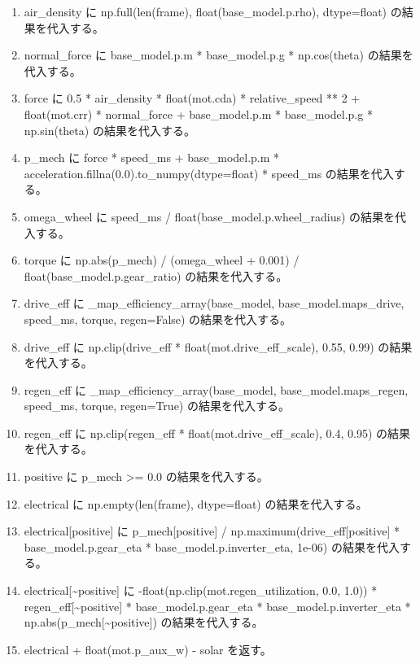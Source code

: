 \documentclass[a4paper,11pt]{article}
\begin{document}
\begin{enumerate}[leftmargin=1.8em]
\item   air\_density に np.full(len(frame), float(base\_model.p.rho), dtype=float) の結果を代入する。
\item normal\_force に base\_model.p.m * base\_model.p.g * np.cos(theta) の結果を代入する。
\item force に 0.5 * air\_density * float(mot.cda) * relative\_speed ** 2 + float(mot.crr) * normal\_force + base\_model.p.m * base\_model.p.g * np.sin(theta) の結果を代入する。
\item p\_mech に force * speed\_ms + base\_model.p.m * acceleration.fillna(0.0).to\_numpy(dtype=float) * speed\_ms の結果を代入する。
\item omega\_wheel に speed\_ms / float(base\_model.p.wheel\_radius) の結果を代入する。
\item torque に np.abs(p\_mech) / (omega\_wheel + 0.001) / float(base\_model.p.gear\_ratio) の結果を代入する。
\item drive\_eff に \_map\_efficiency\_array(base\_model, base\_model.maps\_drive, speed\_ms, torque, regen=False) の結果を代入する。
\item drive\_eff に np.clip(drive\_eff * float(mot.drive\_eff\_scale), 0.55, 0.99) の結果を代入する。
\item regen\_eff に \_map\_efficiency\_array(base\_model, base\_model.maps\_regen, speed\_ms, torque, regen=True) の結果を代入する。
\item regen\_eff に np.clip(regen\_eff * float(mot.drive\_eff\_scale), 0.4, 0.95) の結果を代入する。
\item positive に p\_mech >= 0.0 の結果を代入する。
\item electrical に np.empty(len(frame), dtype=float) の結果を代入する。
\item electrical[positive] に p\_mech[positive] / np.maximum(drive\_eff[positive] * base\_model.p.gear\_eta * base\_model.p.inverter\_eta, 1e-06) の結果を代入する。
\item electrical[\textasciitilde{}positive] に -float(np.clip(mot.regen\_utilization, 0.0, 1.0)) * regen\_eff[\textasciitilde{}positive] * base\_model.p.gear\_eta * base\_model.p.inverter\_eta * np.abs(p\_mech[\textasciitilde{}positive]) の結果を代入する。
\item electrical + float(mot.p\_aux\_w) - solar を返す。
            \end{enumerate}
\end{document}
